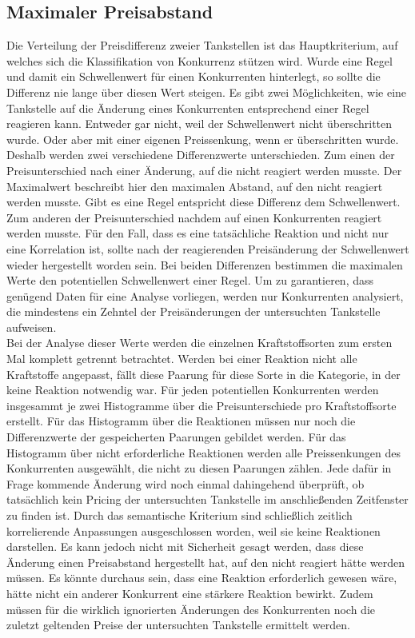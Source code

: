 \subsection{Maximaler Preisabstand}
Die Verteilung der Preisdifferenz zweier Tankstellen ist das Hauptkriterium, auf welches sich die Klassifikation von Konkurrenz stützen wird. Wurde eine Regel und damit ein Schwellenwert für einen Konkurrenten hinterlegt, so sollte die Differenz nie lange über diesen Wert steigen. Es gibt zwei Möglichkeiten, wie eine Tankstelle auf die Änderung eines Konkurrenten entsprechend einer Regel reagieren kann. Entweder gar nicht, weil der Schwellenwert nicht überschritten wurde. Oder aber mit einer eigenen Preissenkung, wenn er überschritten wurde. Deshalb werden zwei verschiedene Differenzwerte unterschieden. Zum einen der Preisunterschied nach einer Änderung, auf die nicht reagiert werden musste. Der Maximalwert beschreibt hier den maximalen Abstand, auf den nicht reagiert werden musste. Gibt es eine Regel entspricht diese Differenz dem Schwellenwert. Zum anderen der Preisunterschied nachdem auf einen Konkurrenten reagiert werden musste. Für den Fall, dass es eine tatsächliche Reaktion und nicht nur eine Korrelation ist, sollte nach der reagierenden Preisänderung der Schwellenwert wieder hergestellt worden sein. Bei beiden Differenzen bestimmen die maximalen Werte den potentiellen Schwellenwert einer Regel. Um zu garantieren, dass genügend Daten für eine Analyse vorliegen, werden nur Konkurrenten analysiert, die mindestens ein Zehntel der Preisänderungen der untersuchten Tankstelle aufweisen.\\
Bei der Analyse dieser Werte werden die einzelnen Kraftstoffsorten zum ersten Mal komplett getrennt betrachtet. Werden bei einer Reaktion nicht alle Kraftstoffe angepasst, fällt diese Paarung für diese Sorte in die Kategorie, in der keine Reaktion notwendig war. Für jeden potentiellen Konkurrenten werden insgesammt je zwei Histogramme über die Preisunterschiede pro Kraftstoffsorte erstellt. Für das Histogramm über die Reaktionen müssen nur noch die Differenzwerte der gespeicherten Paarungen gebildet werden. Für das Histogramm über nicht erforderliche Reaktionen werden alle Preissenkungen des Konkurrenten ausgewählt, die nicht zu diesen Paarungen zählen. Jede dafür in Frage kommende Änderung wird noch einmal dahingehend überprüft, ob tatsächlich kein Pricing der untersuchten Tankstelle im anschließenden Zeitfenster zu finden ist. Durch das semantische Kriterium sind schließlich zeitlich korrelierende Anpassungen ausgeschlossen worden, weil sie keine Reaktionen darstellen. Es kann jedoch nicht mit Sicherheit gesagt werden, dass diese Änderung einen Preisabstand hergestellt hat, auf den nicht reagiert hätte werden müssen. Es könnte durchaus sein, dass eine Reaktion erforderlich gewesen wäre, hätte nicht ein anderer Konkurrent eine stärkere Reaktion bewirkt. Zudem müssen für die wirklich ignorierten Änderungen des Konkurrenten noch die zuletzt geltenden Preise der untersuchten Tankstelle ermittelt werden.\\
